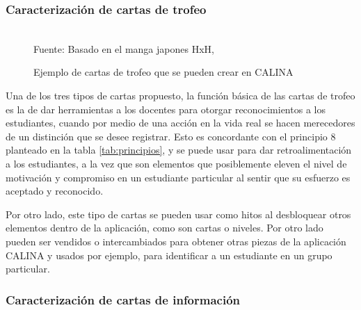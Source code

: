 \subsubsection{Caracterización de cartas de trofeo}

\begin{figure}[!htb]
\caption{Ejemplo de cartas de trofeo que se pueden crear en CALINA}
\label{img:modelodecartastrofeo}
\centering
\begin{adjustbox}{width=12cm}
\end{adjustbox}
\\
{\footnotesize Fuente: Basado en el manga japones HxH, }
\end{figure}

Una de los tres tipos de cartas propuesto, la función básica de las cartas de trofeo es la de dar herramientas 
a los docentes para otorgar reconocimientos a los estudiantes, cuando por medio de una acción en la vida real 
se hacen merecedores de un distinción que se desee registrar. Esto es concordante con el principio 8 planteado 
en la tabla \ref{tab:principios}, y se puede usar para dar retroalimentación a los estudiantes, a la vez que 
son elementos que posiblemente eleven el nivel de motivación y compromiso en un estudiante particular al 
sentir que su esfuerzo es aceptado y reconocido.

Por otro lado, este tipo de cartas se pueden usar como hitos al desbloquear otros elementos dentro de la 
aplicación, como son cartas o niveles. Por otro lado pueden ser vendidos o intercambiados para obtener otras 
piezas de la aplicación CALINA y usados por ejemplo, para identificar a un estudiante en un grupo particular.

\subsubsection{Caracterización de cartas de información}

